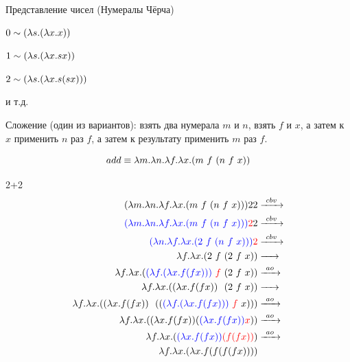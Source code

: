 \begin{frame}{Представление чисел (Нумералы Чёрча)}

  $ 0 \sim (\lambda s . (\lambda x . x))$

  $ 1 \sim (\lambda s . (\lambda x . sx))$

  $ 2 \sim (\lambda s . (\lambda x . s(sx)))$

  и т.д.
  \vspace{1cm}

  Сложение (один из вариантов): взять два нумерала $m$ и $n$, взять $f$ и $x$, а затем к $x$ применить $n$ раз $f$, а затем к результату применить $m$ раз $f$.

  \[
  add \equiv \lambda m. \lambda n. \lambda f. \lambda x. (m\ f\  (n\ f\  x))
  \]
\end{frame}
\newcommand{\tb}[1]{\textcolor{blue}{#1}}
\newcommand{\tr}[1]{\textcolor{red}{#1}}
\begin{frame}{2+2}
  \begin{align*}
    (\lambda m. \lambda n. \lambda f. \lambda x. \app{m\ f\ }{\app{n\ f\ }{x}}){} 2 2 &\cbv \\
    \textcolor{blue}{(\lambda m. \lambda n. \lambda f. \lambda x. \app{m\ f\ }{\app{n\ f\ }{x}}) {}} \textcolor{red}{2} 2 &\cbv \\
    \textcolor{blue}{( \lambda n. \lambda f. \lambda x. \app{2\ f\ }{\app{n\ f\ }{x}}){}} \textcolor{red}{2} & \cbv \\
    \lambda f. \lambda x. \app{2\ f\ }{\app{2\ f\ }{x}}   &\xarr{\ \ } \\
    \lambda f. \lambda x. \app{\tb{\lam{f}{\lam{x}{f (f x)}}} \ \tr{f}\ }{\app{2\ f\ }{x}} &\ao \\
    \lambda f. \lambda x. \app{\lam{x}{f (f x)} \ \ }{\app{2\ f\ }{x}} &\xarr{\ \ } \\
    \lambda f. \lambda x. \app{\lam{x}{f (f x)} \ \ } {\app{\app{\tb{\lam{f}{\lam{x}{f (f x)}}}\ \tr{f}\ }{x}}} &\ao \\
    \lambda f. \lambda x. \app{\lam{x}{f (f x)}  } {\app{\tb{\lam{x}{f (f x)} } }{\tr{x}}} &\ao \\
    \lambda f. \lambda x. \app{\tb{\lam{x}{f (f x)} } } {\tr{(f (f x))}} &\ao \\
    \lambda f. \lambda x. \lam{x}{f (f (f (f x)))} &
  \end{align*}
\end{frame}



